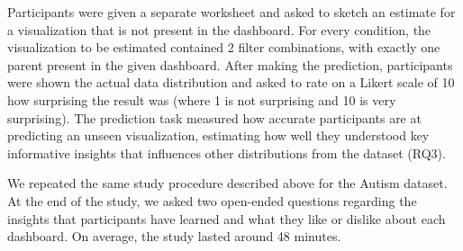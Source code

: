  Participants were given a separate worksheet and asked to sketch an estimate for a visualization that is not present in the dashboard. For every condition, the visualization to be estimated contained 2 filter combinations, with exactly one parent present in the given dashboard. After making the prediction, participants were shown the actual data distribution and asked to rate on a Likert scale of 10 how surprising the result was (where 1 is not surprising and 10 is very surprising). The prediction task measured how accurate participants are at predicting an unseen visualization, estimating how well they understood key informative insights that influences other distributions from the dataset (RQ3).
\par We repeated the same study procedure described above for the Autism dataset. At the end of the study, we asked two open-ended questions regarding the insights that participants have learned and what they like or dislike about each dashboard. On average, the study lasted around 48 minutes.
